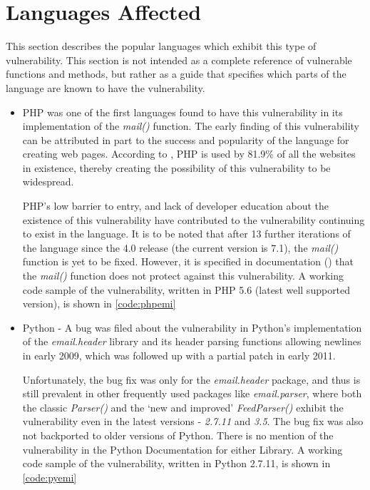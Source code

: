 \section{Languages Affected}

This section describes the popular languages which exhibit this type of vulnerability. This section is not intended as a complete reference of vulnerable functions and methods, but rather as a guide that specifies which parts of the language are known to have the vulnerability.
\begin{itemize}
	\item PHP was one of the first languages found to have this vulnerability in its implementation of the \emph{mail()} function. The early finding of this vulnerability can be attributed in part to the success and popularity of the language for creating web pages. According to \cite{W3techs}, PHP is used by 81.9\% of all the websites in existence, thereby creating the possibility of this vulnerability to be widespread. 
	
	PHP's low barrier to entry, and lack of developer education about the existence of this vulnerability have contributed to the vulnerability continuing to exist in the language.
	It is to be noted that after 13 further iterations of the language since the 4.0 release (the current version is 7.1), the \emph{mail()} function is yet to be fixed. However, it is specified in documentation (\cite{PHPDocs}) that the \emph{mail()} function does not protect against this vulnerability.
	A working code sample of the vulnerability, written in PHP 5.6 (latest well supported version), is shown in  \ref{code:phpemi}
	
	
	
	
	\item Python - A bug was filed about the vulnerability in Python's implementation of the \emph{email.header} library and its header parsing functions allowing newlines in early 2009, which was followed up with a partial patch in early 2011. 
	
	Unfortunately, the bug fix was only for the \emph{email.header} package, and thus is still prevalent in other frequently used packages like \emph{email.parser}, where both the classic \emph{Parser()} and the `new and improved' \emph{FeedParser()} exhibit the vulnerability even in the latest versions - \emph{2.7.11} and \emph{3.5}. The bug fix was also not backported to older versions of Python. 
	There is no mention of the vulnerability in the Python Documentation for either Library.
	A working code sample of the vulnerability, written in Python 2.7.11, is shown in \ref{code:pyemi}
	
	

\end{itemize}

